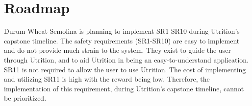 \documentclass{article}
\begin{document}
\section{Roadmap}


Durum Wheat Semolina is planning to implement SR1-SR10 during Utrition's capstone timeline. The safety requirements (SR1-SR10) are easy to implement and do not provide much strain to the system. They exist to guide the user through Utrition, and to aid Utrition in being an easy-to-understand application. SR11 is not required to allow the user to use Utrition. The cost of implementing and utilizing SR11 is high with the reward being low. Therefore, the implementation of this requirement, during Utrition's capstone timeline, cannot be prioritized.
	
\end{document}
